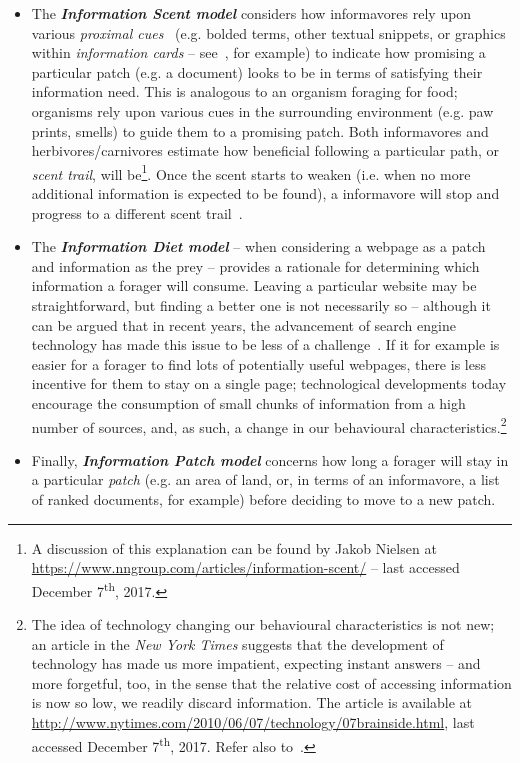 \begin{itemize}
    
    \item{The \textbf{\emph{Information Scent model}} considers how informavores rely upon various \emph{proximal cues}~\citep{chi2001information_scent} (e.g. bolded terms, other textual snippets, or graphics within \emph{information cards} -- see~\cite{bota2016information_cards}, for example) to indicate how promising a particular patch (e.g. a document) looks to be in terms of satisfying their information need. This is analogous to an organism foraging for food; organisms rely upon various cues in the surrounding environment (e.g. paw prints, smells) to guide them to a promising patch. Both informavores and herbivores/carnivores estimate how beneficial following a particular path, or \emph{scent trail}, will be\footnote{A discussion of this explanation can be found by Jakob Nielsen at \url{https://www.nngroup.com/articles/information-scent/} -- last accessed December 7\textsuperscript{th}, 2017.}. Once the scent starts to weaken (i.e. when no more additional information is expected to be found), a informavore will stop and progress to a different scent trail~\citep{piorkowski2012information_scent}.}
    
    \item{The \textbf{\emph{Information Diet model}} -- when considering a webpage as a patch and information as the prey -- provides a rationale for determining which information a forager will consume. Leaving a particular website may be straightforward, but finding a better one is not necessarily so -- although it can be argued that in recent years, the advancement of search engine technology has made this issue to be less of a challenge~\citep{vaughan2004new_measurements}. If it for example is easier for a forager to find lots of potentially useful webpages, there is less incentive for them to stay on a single page; technological developments today encourage the consumption of small chunks of information from a high number of sources, and, as such, a change in our behavioural characteristics.\footnote{The idea of technology changing our behavioural characteristics is not new; an article in the \emph{New York Times} suggests that the development of technology has made us more impatient, expecting instant answers -- and more forgetful, too, in the sense that the relative cost of accessing information is now so low, we readily discard information. The article is available at \url{http://www.nytimes.com/2010/06/07/technology/07brainside.html}, last accessed December 7\textsuperscript{th}, 2017. Refer also to~\cite{carr2008google_stupid}.}}
    
    \item{Finally, \textbf{\emph{Information Patch model}} concerns how long a forager will stay in a particular \emph{patch} (e.g. an area of land, or, in terms of an informavore, a list of ranked documents, for example) before deciding to move to a new patch.}
    
\end{itemize}

